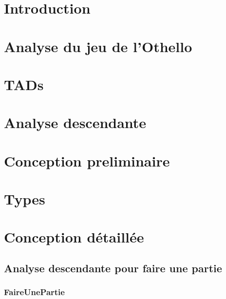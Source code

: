 


  

  \newpage
  \tableofcontents

  \newpage
  \section{Introduction}
    

  \newpage
  \section{Analyse du jeu de l'Othello}
    

  \newpage
  \section{TADs}
    

  \newpage
  \section{Analyse descendante}
    

  \newpage
  \section{Conception preliminaire}
    
    
    

  \newpage
  \section{Types}
    

  \newpage
  \section{Conception détaillée}
  \subsection{Analyse descendante pour faire une partie}
     \subsubsection{FaireUnePartie}
      
